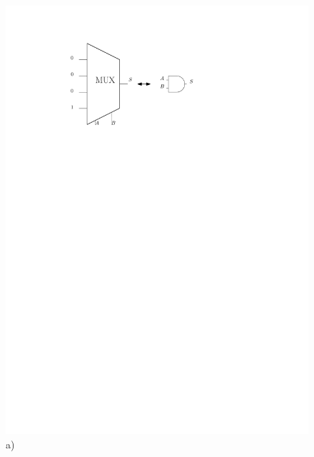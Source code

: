 \begin{figure}[htbp]
   \begin{minipage}[c]{.4\linewidth}
\includegraphics[width=\linewidth]{Figs/and_mux.pdf} \\\centering a)
   \end{minipage} \hfill
   \begin{minipage}[c]{0.4\linewidth}

\end{minipage}
\end{figure}
